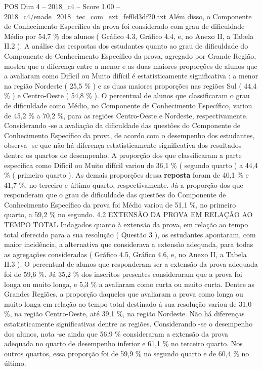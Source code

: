 \begin{textsample}{POS Dim 4 – 2018\_c4 – Score 1.00 – 2018\_c4/enade\_2018\_tec\_com\_ext\_fef0d3df20.txt}
Além disso, o Componente de Conhecimento Específico da prova foi considerado com grau de dificuldade Médio por 54,7 \% dos alunos ( Gráfico 4.3, Gráfico 4.4, e, no Anexo II, a Tabela II.2 ).
A análise das respostas dos estudantes quanto ao grau de dificuldade do Componente de Conhecimento Específico da prova, agregado por Grande Região, mostra que a diferença entre a menor e as duas maiores proporções de alunos que a avaliaram como Difícil ou Muito difícil é estatisticamente significativa : a menor na região Nordeste ( 25,5 \% ) e as duas maiores proporções nas regiões Sul ( 44,4 \% ) e Centro-Oeste ( 54,8 \% ).
O percentual de alunos que classificaram o grau de dificuldade como Médio, no Componente de Conhecimento Específico, variou de 45,2 \% a 70,2 \%, para as regiões Centro-Oeste e Nordeste, respectivamente.
Considerando -se a avaliação da dificuldade das questões do Componente de Conhecimento Específico da prova, de acordo com o desempenho dos estudantes, observa -se que não há diferença estatisticamente significativa dos resultados dentre os quartos de desempenho.
A proporção dos que classificaram a parte específica como Difícil ou Muito difícil variou de 36,1 \% ( segundo quarto ) a 44,4 \% ( primeiro quarto ).
As demais proporções dessa \textbf{reposta} foram de 40,1 \% e 41,7 \%, no terceiro e último quarto, respectivamente.
Já a proporção dos que responderam que o grau de dificuldade das questões do Componente de Conhecimento Específico da prova foi Médio variou de 51,1 \%, no primeiro quarto, a 59,2 \% no segundo. 4.2 EXTENSÃO DA PROVA EM RELAÇÃO AO TEMPO TOTAL Indagados quanto à extensão da prova, em relação ao tempo total oferecido para a sua resolução ( Questão 3 ), os estudantes apontaram, com maior incidência, a alternativa que considerava a extensão adequada, para todas as agregações consideradas ( Gráfico 4.5, Gráfico 4.6, e, no Anexo II, a Tabela II.3 ).
O percentual de alunos que responderam ser a extensão da prova adequada foi de 59,6 \%.
Já 35,2 \% dos inscritos presentes consideraram que a prova foi longa ou muito longa, e 5,3 \% a avaliaram como curta ou muito curta.
Dentre as Grandes Regiões, a proporção daqueles que avaliaram a prova como longa ou muito longa em relação ao tempo total destinado à sua resolução variou de 31,0 \%, na região Centro-Oeste, até 39,1 \%, na região Nordeste.
Não há diferenças estatisticamente significativas dentre as regiões.
Considerando -se o desempenho dos alunos, nota -se ainda que 56,9 \% consideraram a extensão da prova adequada no quarto de desempenho inferior e 61,1 \% no terceiro quarto.
Nos outros quartos, essa proporção foi de 59,9 \% no segundo quarto e de 60,4 \% no último.

\end{textsample}
